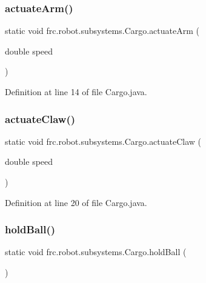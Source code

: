 \subsubsection{\texorpdfstring{actuate\+Arm()}{actuateArm()}}
{\footnotesize\ttfamily static void frc.\+robot.\+subsystems.\+Cargo.\+actuate\+Arm (\begin{DoxyParamCaption}\item[{double}]{speed }\end{DoxyParamCaption})\hspace{0.3cm}{\ttfamily [static]}}



Definition at line 14 of file Cargo.\+java.

\mbox{\label{classfrc_1_1robot_1_1subsystems_1_1_cargo_aa05df516e815067a7b853d9fbdc35f01}} 
\subsubsection{\texorpdfstring{actuate\+Claw()}{actuateClaw()}}
{\footnotesize\ttfamily static void frc.\+robot.\+subsystems.\+Cargo.\+actuate\+Claw (\begin{DoxyParamCaption}\item[{double}]{speed }\end{DoxyParamCaption})\hspace{0.3cm}{\ttfamily [static]}}



Definition at line 20 of file Cargo.\+java.

\mbox{\label{classfrc_1_1robot_1_1subsystems_1_1_cargo_a8a4dd09c62967c4d82af8953cf8ab731}} 
\subsubsection{\texorpdfstring{hold\+Ball()}{holdBall()}}
{\footnotesize\ttfamily static void frc.\+robot.\+subsystems.\+Cargo.\+hold\+Ball (\begin{DoxyParamCaption}{ }\end{DoxyParamCaption})\hspace{0.3cm}{\ttfamily [static]}}



